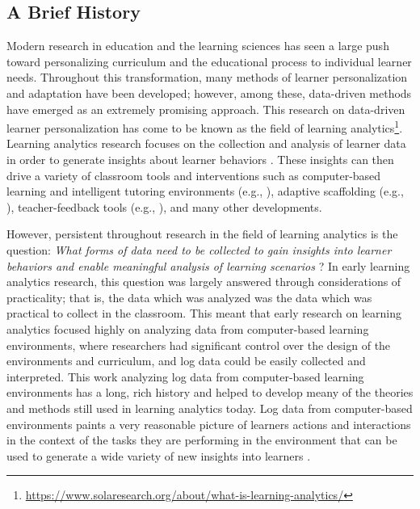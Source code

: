\documentclass[manuscript,screen,review]{acmart}
\begin{document}
\subsection{A Brief History}

Modern research in education and the learning sciences has seen a large push toward personalizing curriculum and the educational process to individual learner needs. Throughout this transformation, many methods of learner personalization and adaptation have been developed; however, among these, data-driven methods have emerged as an extremely promising approach. This research on data-driven learner personalization has come to be known as the field of learning analytics\footnote{\href{https://www.solaresearch.org/about/what-is-learning-analytics/}{https://www.solaresearch.org/about/what-is-learning-analytics/}}. Learning analytics research focuses on the collection and analysis of learner data in order to generate insights about learner behaviors \cite{maseleno2018demystifying, Zilvinskis2017}. These insights can then drive a variety of classroom tools and interventions such as computer-based learning and intelligent tutoring environments (e.g., \cite{heffernan2014assistments, leelawong2008designing}), adaptive scaffolding (e.g., \cite{Emerson2020, basu2017learner}), teacher-feedback tools (e.g., \cite{rodriguez2018teacher, Hutchins2023}), and many other developments. 

However, persistent throughout research in the field of learning analytics is the question: \textit{What forms of data need to be collected to gain insights into learner behaviors and enable meaningful analysis of learning scenarios} \cite{vatral2022using, ochoa2017multimodal}? In early learning analytics research, this question was largely answered through considerations of practicality; that is, the data which was analyzed was the data which was practical to collect in the classroom. This meant that early research on learning analytics focused highly on analyzing data from computer-based learning environments, where researchers had significant control over the design of the environments and curriculum, and log data could be easily collected and interpreted. This work analyzing log data from computer-based learning environments has a long, rich history and helped to develop meany of the theories and methods still used in learning analytics today. Log data from computer-based environments paints a very reasonable picture of learners actions and interactions in the context of the tasks they are performing in the environment that can be used to generate a wide variety of new insights into learners \cite{hoppe2017computational, ochoa2017multimodal}. 
\end{document}
